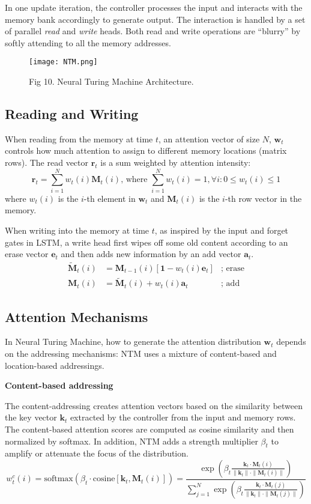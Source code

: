 \documentclass[12pt]{article}
\begin{document}
In one update iteration, the controller processes the input and interacts with the memory bank accordingly to generate output. The interaction is handled by a set of parallel \emph{read} and \emph{write} heads. Both read and write operations are ``blurry'' by softly attending to all the memory addresses.

\begin{figure}[H]
    \centering
    \texttt{[image: NTM.png]}
    \caption{Fig 10. Neural Turing Machine Architecture.}
\end{figure}

\subsection{Reading and Writing}
When reading from the memory at time $t$, an attention vector of size $N$, $\mathbf{w}_t$ controls how much attention to assign to different memory locations (matrix rows). The read vector $\mathbf{r}_t$ is a sum weighted by attention intensity:
\[
\mathbf{r}_t = \sum_{i=1}^N w_t(i)\mathbf{M}_t(i)\text{, where }\sum_{i=1}^N w_t(i)=1, \forall i: 0 \leq w_t(i) \leq 1
\]
where $w_t(i)$ is the $i$-th element in $\mathbf{w}_t$ and $\mathbf{M}_t(i)$ is the $i$-th row vector in the memory.

When writing into the memory at time $t$, as inspired by the input and forget gates in LSTM, a write head first wipes off some old content according to an erase vector $\mathbf{e}_t$ and then adds new information by an add vector $\mathbf{a}_t$.
\[
\begin{aligned}
\tilde{\mathbf{M}}_t(i) &= \mathbf{M}_{t-1}(i) [\mathbf{1} - w_t(i)\mathbf{e}_t] &\scriptstyle{\text{; erase}}\\
\mathbf{M}_t(i) &= \tilde{\mathbf{M}}_t(i) + w_t(i) \mathbf{a}_t &\scriptstyle{\text{; add}}
\end{aligned}
\]

\subsection{Attention Mechanisms}
In Neural Turing Machine, how to generate the attention distribution $\mathbf{w}_t$ depends on the addressing mechanisms: NTM uses a mixture of content-based and location-based addressings.

\textbf{Content-based addressing}

The content-addressing creates attention vectors based on the similarity between the key vector $\mathbf{k}_t$ extracted by the controller from the input and memory rows. The content-based attention scores are computed as cosine similarity and then normalized by softmax. In addition, NTM adds a strength multiplier $\beta_t$ to amplify or attenuate the focus of the distribution.
\[
w_t^c(i) 
= \text{softmax}(\beta_t \cdot \text{cosine}[\mathbf{k}_t, \mathbf{M}_t(i)])
= \frac{\exp(\beta_t \frac{\mathbf{k}_t \cdot \mathbf{M}_t(i)}{\|\mathbf{k}_t\| \cdot \|\mathbf{M}_t(i)\|})}{\sum_{j=1}^N \exp(\beta_t \frac{\mathbf{k}_t \cdot \mathbf{M}_t(j)}{\|\mathbf{k}_t\| \cdot \|\mathbf{M}_t(j)\|})}
\]
\end{document}

